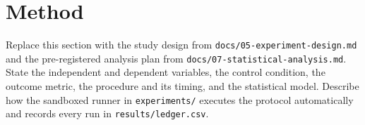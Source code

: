 \section{Method}

Replace this section with the study design from
\texttt{docs/05-experiment-design.md} and the pre-registered analysis plan from
\texttt{docs/07-statistical-analysis.md}. State the independent and dependent
variables, the control condition, the outcome metric, the procedure and its
timing, and the statistical model. Describe how the sandboxed runner in
\texttt{experiments/} executes the protocol automatically and records every run
in \texttt{results/ledger.csv}.
